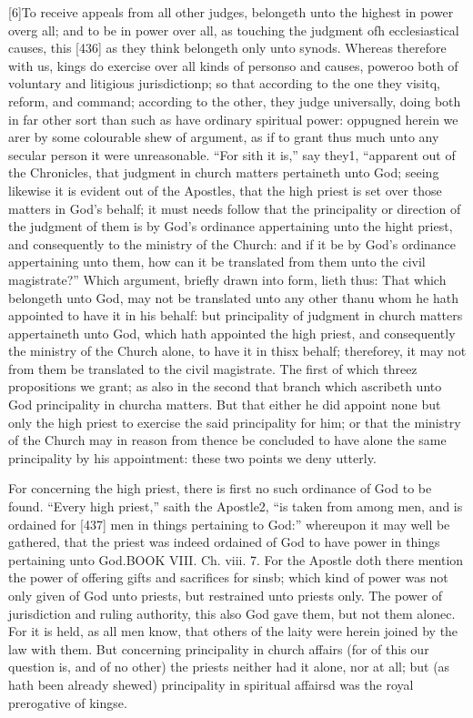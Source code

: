 [6]To receive appeals from all other judges, belongeth unto the highest in power overg all; and to be in power over all, as touching the judgment ofh ecclesiastical causes, this [436] as they think belongeth only unto synods. Whereas therefore with us, kings do exercise over all kinds of personso and causes, poweroo both of voluntary and litigious jurisdictionp; so that according to the one they visitq, reform, and command; according to the other, they judge universally, doing both in far other sort than such as have ordinary spiritual power: oppugned herein we arer by some colourable shew of argument, as if to grant thus much unto any secular person it were unreasonable. “For sith it is,” say they1, “apparent out of the Chronicles, that judgment in church matters pertaineth unto God; seeing likewise it is evident out of the Apostles, that the high priest is set over those matters in God’s behalf; it must needs follow that the principality or direction of the judgment of them is by God’s ordinance appertaining unto the hight priest, and consequently to the ministry of the Church: and if it be by God’s ordinance appertaining unto them, how can it be translated from them unto the civil magistrate?” Which argument, briefly drawn into form, lieth thus: That which belongeth unto God, may not be translated unto any other thanu whom he hath appointed to have it in his behalf: but principality of judgment in church matters appertaineth unto God, which hath appointed the high priest, and consequently the ministry of the Church alone, to have it in thisx behalf; thereforey, it may not from them be translated to the civil magistrate. The first of which threez propositions we grant; as also in the second that branch which ascribeth unto God principality in churcha matters. But that either he did appoint none but only the high priest to exercise the said principality for him; or that the ministry of the Church may in reason from thence be concluded to have alone the same principality by his appointment: these two points we deny utterly.

For concerning the high priest, there is first no such ordinance of God to be found. “Every high priest,” saith the Apostle2, “is taken from among men, and is ordained for [437] men in things pertaining to God:” whereupon it may well be gathered, that the priest was indeed ordained of God to have power in things pertaining unto God.BOOK VIII. Ch. viii. 7. For the Apostle doth there mention the power of offering gifts and sacrifices for sinsb; which kind of power was not only given of God unto priests, but restrained unto priests only. The power of jurisdiction and ruling authority, this also God gave them, but not them alonec. For it is held, as all men know, that others of the laity were herein joined by the law with them. But concerning principality in church affairs (for of this our question is, and of no other) the priests neither had it alone, nor at all; but (as hath been already shewed) principality in spiritual affairsd was the royal prerogative of kingse.

